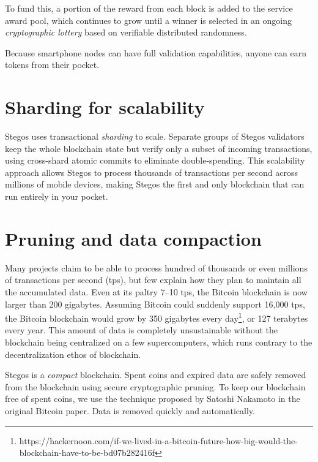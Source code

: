 \documentclass[8pt,fleqn,openany]{book}
\begin{document}
	
	To fund this, a portion of the reward from each block is added to the service award pool, which continues to grow until a winner is selected in an ongoing \textit{cryptographic lottery} based on verifiable distributed randomness. 
	
	Because smartphone nodes can have full validation capabilities, anyone can earn tokens from their pocket.
	
	\section{Sharding for scalability}
	Stegos uses transactional \textit{sharding} to scale. Separate groups of Stegos validators keep the whole blockchain state but verify only a subset of incoming transactions, using cross-shard atomic commits to eliminate double-spending. This scalability approach allows Stegos to process thousands of transactions per second across millions of mobile devices, making Stegos the first and only blockchain that can run entirely in your pocket. 
	
	\section{Pruning and data compaction}
	Many projects claim to be able to process hundred of thousands or even millions of transactions per second (tps), but few explain how they plan to maintain all the accumulated data. Even at its paltry 7--10 tps, the Bitcoin blockchain is now larger than 200 gigabytes. Assuming Bitcoin could suddenly support 16,000 tps, the Bitcoin blockchain would grow by 350 gigabytes every day\footnote{https://hackernoon.com/if-we-lived-in-a-bitcoin-future-how-big-would-the-blockchain-have-to-be-bd07b282416f}, or 127 terabytes every year. This amount of data is completely unsustainable without the blockchain being centralized on a few supercomputers, which runs contrary to the decentralization ethos of blockchain.
	
	Stegos is a \textit{compact} blockchain. Spent coins and expired data are safely removed from the blockchain using secure cryptographic pruning. To keep our blockchain free of spent coins, we use the technique proposed by Satoshi Nakamoto in the original Bitcoin paper\cite{c1}. Data is removed quickly and automatically.
	
\end{document}
